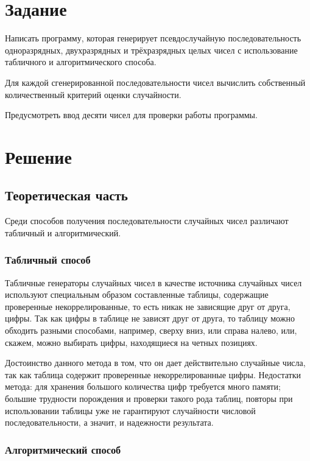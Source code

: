 \documentclass[12pt]{report}
\begin{document}
	
	\setcounter{page}{2}

\chapter{Задание}
Написать программу, которая генерирует псевдослучайную последовательность одноразрядных, двухразрядных и трёхразрядных целых чисел с использование табличного и алгоритмического способа.

Для каждой сгенерированной последовательности чисел вычислить собственный количественный критерий оценки случайности.

Предусмотреть ввод десяти чисел для проверки работы программы.


\chapter{Решение}
\section{Теоретическая часть}

Среди способов получения последовательности случайных чисел различают табличный и алгоритмический.

\subsection*{Табличный способ}

Табличные генераторы случайных чисел в качестве источника случайных чисел используют специальным образом составленные таблицы, содержащие проверенные некоррелированные, то есть никак не зависящие друг от друга, цифры. Так как цифры в таблице не зависят друг от друга, то таблицу можно обходить разными способами, например, сверху вниз, или справа налево, или, скажем, можно выбирать цифры, находящиеся на четных позициях.

Достоинство данного метода в том, что он дает действительно случайные числа, так как таблица содержит проверенные некоррелированные цифры. Недостатки метода: для хранения большого количества цифр требуется много памяти; большие трудности порождения и проверки такого рода таблиц, повторы при использовании таблицы уже не гарантируют случайности числовой последовательности, а значит, и надежности результата.

\subsection*{Алгоритмический способ}
\end{document}
